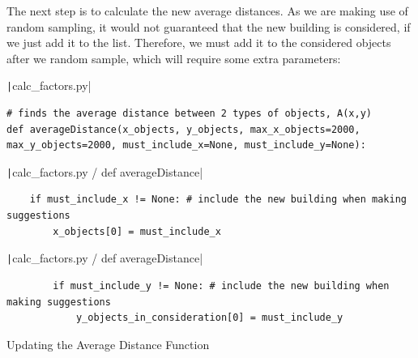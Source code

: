 \documentclass[12pt]{report}
\newcommand{\pil}[1]{\protect\texttt|#1|}
\begin{document}
\begin{center}
\end{center}

The next step is to calculate the new average distances. As we are making use of random sampling, it would not guaranteed that the new building is considered, if we just add it to the list. Therefore, we must add it to the considered objects after we random sample, which will require some extra parameters:

\begin{listing}[H]
\pil{calc_factors.py}
\begin{verbatim}
# finds the average distance between 2 types of objects, A(x,y)
def averageDistance(x_objects, y_objects, max_x_objects=2000, max_y_objects=2000, must_include_x=None, must_include_y=None):
\end{verbatim}
\pil{calc_factors.py / def averageDistance}
\begin{verbatim}
    if must_include_x != None: # include the new building when making suggestions
        x_objects[0] = must_include_x
\end{verbatim}
\pil{calc_factors.py / def averageDistance}
\begin{verbatim}
        if must_include_y != None: # include the new building when making suggestions
            y_objects_in_consideration[0] = must_include_y
\end{verbatim}
\caption{Updating the Average Distance Function}\label{cs:updateAverageDistance}
\end{listing}
\end{document}
